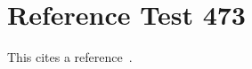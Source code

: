 \documentclass{article}
\begin{document}
\section{Reference Test 473}
This cites a reference~\cite{test473}.

\end{document}
